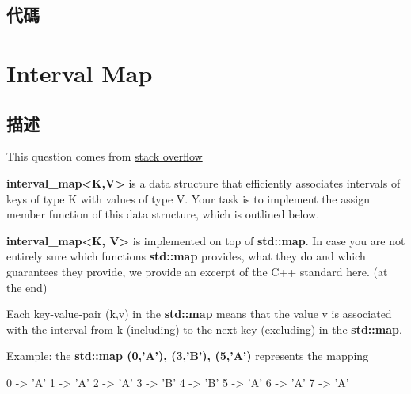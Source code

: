 \subsection{代碼}

\section{Interval Map}
\label{sec:interval-map}

\subsection{描述}
This question comes from \href{https://stackoverflow.com/q/54068482/2358836}{stack overflow}

\textbf{interval_map<K,V>} is a data structure that efficiently associates intervals of keys of type K with values of type V. Your task is to implement the assign member function of this data structure, which is outlined below.

\textbf{interval_map<K, V>} is implemented on top of \textbf{std::map}. In case you are not entirely sure which functions \textbf{std::map} provides, what they do and which guarantees they provide, we provide an excerpt of the C++ standard here. (at the end)

Each key-value-pair (k,v) in the \textbf{std::map} means that the value v is associated with the interval from k (including) to the next key (excluding) in the \textbf{std::map}.

Example: the \textbf{std::map (0,'A'), (3,'B'), (5,'A')} represents the mapping

\begin{Code}
    0 -> 'A'
    1 -> 'A'
    2 -> 'A'
    3 -> 'B'
    4 -> 'B'
    5 -> 'A'
    6 -> 'A'
    7 -> 'A'
\end{Code}

